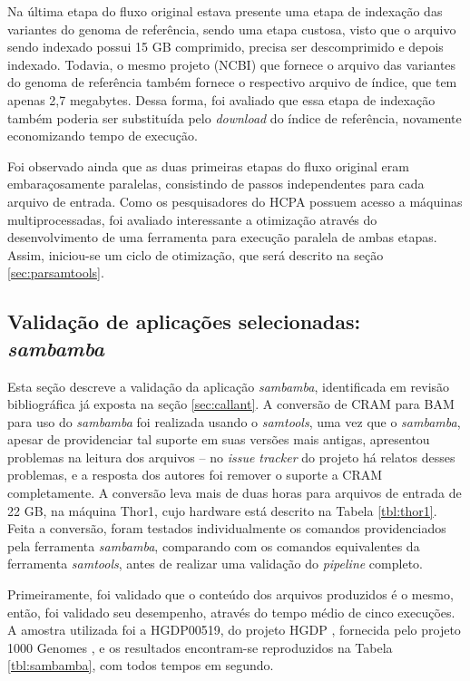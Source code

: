 \documentclass[cic,tc]{iiufrgs}
\begin{document}
Na última etapa do fluxo original estava presente uma etapa de indexação das
variantes do genoma de referência, sendo uma etapa custosa, visto que o arquivo
sendo indexado possui 15 GB comprimido, precisa ser descomprimido e depois
indexado. Todavia, o mesmo projeto (NCBI) que fornece o arquivo das variantes
do genoma de referência também fornece o respectivo arquivo de índice, que tem
apenas 2,7 megabytes. Dessa forma, foi avaliado que essa etapa de indexação
também poderia ser substituída pelo \textit{download} do índice de referência,
novamente economizando tempo de execução.

Foi observado ainda que as duas primeiras etapas do fluxo original eram
embaraçosamente paralelas, consistindo de passos independentes para cada
arquivo de entrada. Como os pesquisadores do HCPA possuem acesso a máquinas
multiprocessadas, foi avaliado interessante a otimização através do
desenvolvimento de uma ferramenta para execução paralela de ambas etapas.
Assim, iniciou-se um ciclo de otimização, que será descrito na seção
\ref{sec:parsamtools}.

\subsection{Validação de aplicações selecionadas: \textit{sambamba}}
\label{sec:sambamba}

Esta seção descreve a validação da aplicação \textit{sambamba}, identificada em revisão
bibliográfica já exposta na seção \ref{sec:callant}. A conversão de CRAM para
BAM para uso do \textit{sambamba} foi realizada usando o \textit{samtools}, uma vez que o
\textit{sambamba}, apesar de providenciar tal suporte em suas versões mais antigas,
apresentou problemas na leitura dos arquivos -- no \textit{issue tracker} do
projeto há relatos desses problemas, e a resposta dos autores foi remover o
suporte a CRAM completamente. A conversão leva mais de duas horas para arquivos
de entrada de 22 GB, na máquina Thor1, cujo hardware está descrito na
Tabela \ref{tbl:thor1}. Feita a conversão, foram testados individualmente os
comandos providenciados pela ferramenta \textit{sambamba}, comparando com os comandos
equivalentes da ferramenta \textit{samtools}, antes de realizar uma validação
do \textit{pipeline} completo. 

Primeiramente, foi validado que o conteúdo dos arquivos produzidos é o mesmo,
então, foi validado seu desempenho, através do tempo médio de cinco execuções.
A amostra utilizada foi a HGDP00519, do projeto HGDP \cite{cavalli2005human},
fornecida pelo projeto 1000 Genomes \cite{via20101000}, e os resultados
encontram-se reproduzidos na Tabela \ref{tbl:sambamba}, com todos tempos em segundo.
\end{document}
